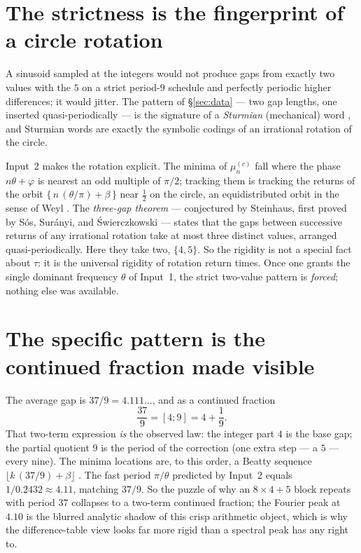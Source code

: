 \documentclass[11pt]{amsart}
\begin{document}
\section{The strictness is the fingerprint of a circle rotation}

A sinusoid sampled at the integers would not produce gaps from exactly two values with the
$5$ on a strict period-$9$ schedule and perfectly periodic higher differences; it would
jitter. The pattern of \S\ref{sec:data} --- two gap lengths, one inserted quasi-periodically
--- is the signature of a \emph{Sturmian} (mechanical) word
\cite{MorseHedlund1940,Lothaire2002}, and Sturmian words are exactly the symbolic codings of
an irrational rotation of the circle.

Input~2 makes the rotation explicit. The minima of $\mu_n^{(c)}$ fall where the phase
$n\theta+\varphi$ is nearest an odd multiple of $\pi/2$; tracking them is tracking the
returns of the orbit $\{\,n\,(\theta/\pi)+\beta\,\}$ near $\tfrac12$ on the circle, an
equidistributed orbit in the sense of Weyl \cite{Weyl1916,KuipersNiederreiter1974}. The
\emph{three-gap theorem} --- conjectured by Steinhaus, first proved by S\'os, Sur\'anyi, and
\'Swierczkowski \cite{Sos1958,Suranyi1958,Swierczkowski1958,vanRavenstein1988} --- states
that the gaps between successive returns of any irrational rotation take at most three
distinct values, arranged quasi-periodically. Here they take two, $\{4,5\}$. So the rigidity
is not a special fact about $\tau$: it is the universal rigidity of rotation return times.
Once one grants the single dominant frequency $\theta$ of Input~1, the strict two-value
pattern is \emph{forced}; nothing else was available.

\section{The specific pattern is the continued fraction made visible}

The average gap is $37/9=4.111\ldots$, and as a continued fraction
\[
\frac{37}{9}=[4;9]=4+\frac{1}{9}.
\]
That two-term expression \emph{is} the observed law: the integer part $4$ is the base gap;
the partial quotient $9$ is the period of the correction (one extra step --- a $5$ --- every
nine). The minima locations are, to this order, a Beatty sequence
$\lfloor k\,(37/9)+\beta\rfloor$ \cite{Beatty1926,HardyWright}. The fast period $\pi/\theta$
predicted by Input~2 equals $1/0.2432\approx4.11$, matching $37/9$. So the puzzle of why an
$8\times4+5$ block repeats with period $37$ collapses to a two-term continued fraction; the
Fourier peak at $4.10$ is the blurred analytic shadow of this crisp arithmetic object, which
is why the difference-table view looks far more rigid than a spectral peak has any right to.
\end{document}
